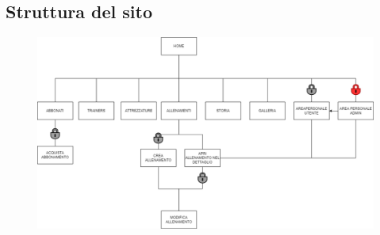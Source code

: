 \documentclass[a4paper]{article}
\begin{document}
	\subsection{Struttura del sito}
	\begin{figure}
		\centering
		\includegraphics[scale=0.3]{immagini/mappa sito.drawio.png} 
	\end{figure}
\end{document}

